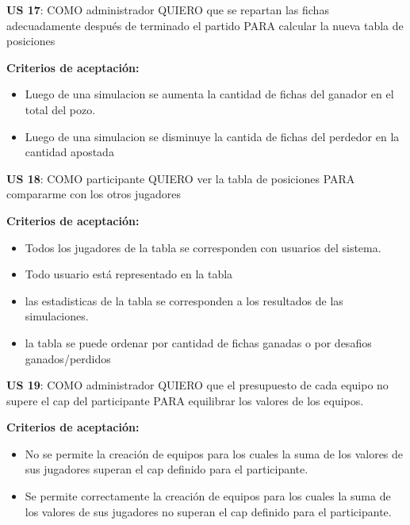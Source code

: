 \begin{tcolorbox}
\textbf{US 17}: COMO administrador QUIERO que se repartan las fichas adecuadamente después de terminado el partido PARA calcular la nueva tabla de posiciones

\vline

\textbf{Criterios de aceptación:}
\begin{itemize}
\item Luego de una simulacion se aumenta la cantidad de fichas del ganador en el total del pozo.
\item Luego de una simulacion se disminuye la cantida de fichas del perdedor en la cantidad apostada
\end{itemize}
\end{tcolorbox}
\vspace{10pt}

\begin{tcolorbox}
\textbf{US 18}: COMO participante QUIERO ver la tabla de posiciones PARA compararme con los otros jugadores

\vline

\textbf{Criterios de aceptación:}
\begin{itemize}
\item Todos los jugadores de la tabla se corresponden con usuarios del sistema.
\item Todo usuario está representado en la tabla
\item las estadisticas de la tabla se corresponden a los resultados de las simulaciones.
\item la tabla se puede ordenar por cantidad de fichas ganadas o por desafios ganados/perdidos
\end{itemize}
\end{tcolorbox}
\vspace{10pt}

\begin{tcolorbox}
\textbf{US 19}: COMO administrador QUIERO que el presupuesto de cada equipo no supere el cap del participante PARA equilibrar los valores de los equipos.

\vline

\textbf{Criterios de aceptación:}
\begin{itemize}
\item No se permite la creación de equipos para los cuales la suma de los valores de sus jugadores superan el cap definido para el participante.
\item Se permite correctamente la creación de equipos para los cuales la suma de los valores de sus jugadores no superan el cap definido para el participante.
\end{itemize}
\end{tcolorbox}
\vspace{10pt}


